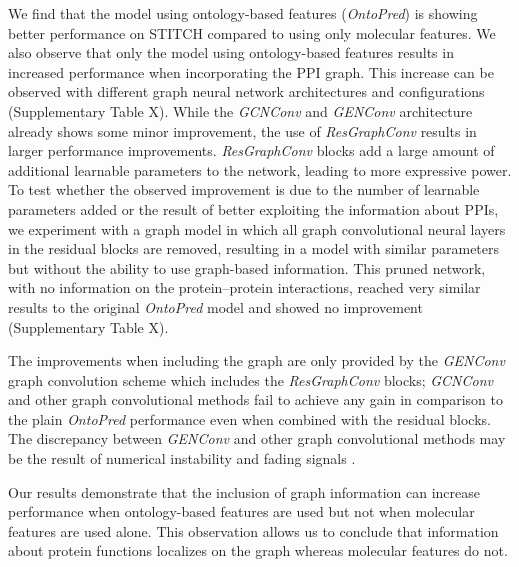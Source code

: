\documentclass{bioinfo}
\renewcommand{\cite}{\citep}
\begin{document}
We find that the model using ontology-based features
(\textit{OntoPred}) is showing better performance on STITCH compared
to using only molecular features. We also observe that only the model
using ontology-based features results in increased performance when
incorporating the PPI graph. This increase can be observed with
different graph neural network architectures and configurations
(Supplementary Table X). While the {\em
  GCNConv} and {\em GENConv} architecture already shows some minor
improvement, the use of \textit{ResGraphConv} results in larger
performance improvements.  {\em ResGraphConv} blocks add a large
amount of additional learnable parameters to the network, leading to
more expressive power. To test whether the observed improvement is due
to the number of learnable parameters added or the result of better
exploiting the information about PPIs, we experiment with a graph
model in which all graph convolutional neural layers in the residual
blocks are removed, resulting in a model with similar parameters but
without the ability to use graph-based information. This pruned
network, with no information on the protein--protein interactions,
reached very similar results to the original \textit{OntoPred} model
and showed no improvement (Supplementary Table X).

The improvements when including the graph are only provided by the
\textit{GENConv} graph convolution scheme which includes the
{\em ResGraphConv} blocks; \textit{GCNConv} and other graph
convolutional methods fail to achieve any gain in comparison to the
plain \textit{OntoPred} performance even when combined with the
residual blocks. The discrepancy between {\em GENConv} and other graph
convolutional methods may be the result of numerical instability and
fading signals \cite{}.

Our results demonstrate that the inclusion of graph information
can increase performance when ontology-based features are used but not
when molecular features are used alone. This observation allows us to
conclude that information about protein functions localizes on the
graph whereas molecular features do not.

\end{document}
